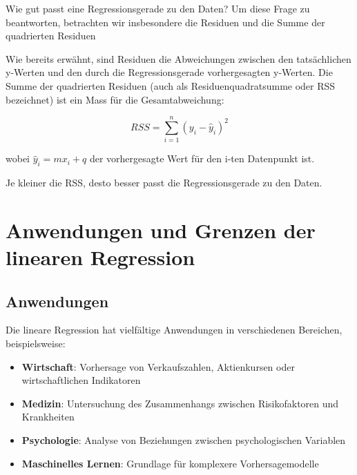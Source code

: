 Wie gut passt eine Regressionsgerade zu den Daten? Um diese Frage zu beantworten, betrachten wir insbesondere die Residuen und die Summe der quadrierten Residuen

Wie bereits erwähnt, sind Residuen die Abweichungen zwischen den tatsächlichen y-Werten und den durch die Regressionsgerade vorhergesagten y-Werten. Die Summe der quadrierten Residuen (auch als Residuenquadratsumme oder RSS bezeichnet) ist ein Mass für die Gesamtabweichung:

\[RSS = \sum_{i=1}^{n} (y_i - \hat{y}_i)^2\]

wobei $\hat{y}_i = mx_i + q$ der vorhergesagte Wert für den i-ten Datenpunkt ist.

Je kleiner die RSS, desto besser passt die Regressionsgerade zu den Daten.

\section{Anwendungen und Grenzen der linearen Regression}

\subsection{Anwendungen}

Die lineare Regression hat vielfältige Anwendungen in verschiedenen Bereichen, beispielsweise:

\begin{itemize}
	\item \textbf{Wirtschaft}: Vorhersage von Verkaufszahlen, Aktienkursen oder wirtschaftlichen Indikatoren
	\item \textbf{Medizin}: Untersuchung des Zusammenhangs zwischen Risikofaktoren und Krankheiten
	\item \textbf{Psychologie}: Analyse von Beziehungen zwischen psychologischen Variablen
	\item \textbf{Maschinelles Lernen}: Grundlage für komplexere Vorhersagemodelle
\end{itemize}

\clearpage


